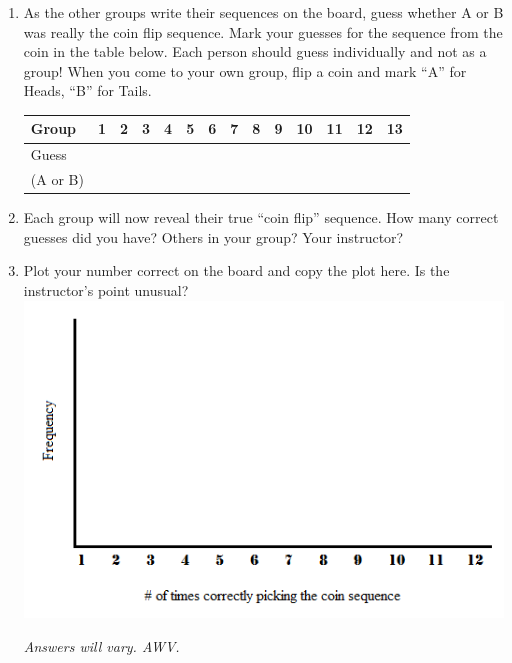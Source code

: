 \begin{enumerate}
  \item As the other groups write their sequences on the board, 
    guess whether A or B was really the coin flip sequence.  Mark
    your guesses for the sequence from the coin in the table below.
    Each person should guess individually and not as a group!  
    When you come to your own group, flip a coin and mark ``A'' for
    Heads, ``B'' for Tails.\\
    \hspace{-.4in}
    \begin{tabular}{|l|c|c|c|c|c|c|c|c|c|c|c|c|c|}
      \hline
      Group  &1   &  2  &  3  &  4  &  5  &  6  &  7  &  8  &  9  & 
      10 & 11 & 12 & 13\\
      \hline
      Guess  & \hspace{.2in} & \hspace{.2in}& \hspace{.2in}& \hspace{.2in}& \hspace{.2in}& \hspace{.2in}& \hspace{.2in}& \hspace{.2in}& \hspace{.2in}& \hspace{.2in}& \hspace{.2in}& \hspace{.2in}& \hspace{.2in}\\
(A or B)&&&&&&&&&&&&&\\
\hline
%
\hline
\end{tabular}


    \item Each group will now reveal their true ``coin flip''
      sequence.  How many correct guesses did you have? Others in your
      group?  Your instructor? \vspace{1in} 
    \item Plot your number correct on the board and copy the plot
      here. Is the instructor's point unusual?  \\
    \includegraphics[width=0.5\linewidth]{plots/Act1-NullDist.png}
\begin{students}
  \vspace{1cm}
\end{students}    
\begin{key}
   {\it Answers will vary. AWV.}
\end{key}
 


\end{enumerate}
